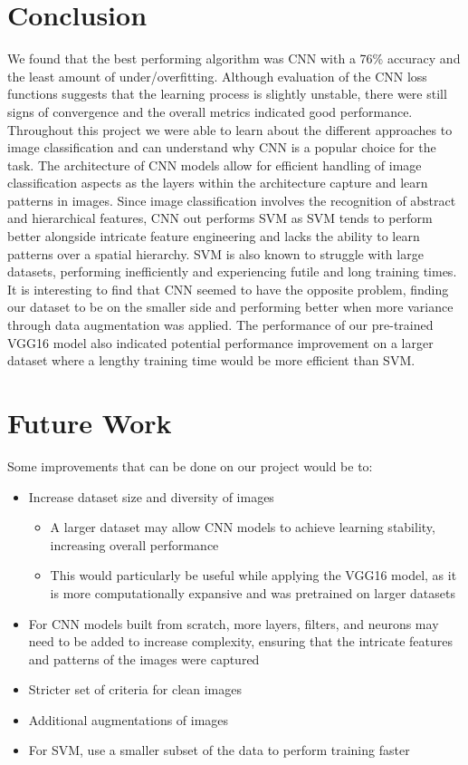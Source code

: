 %

\section{Conclusion}
We found that the best performing algorithm was CNN with a 76\% accuracy and the least amount of under/overfitting. Although evaluation of the CNN loss functions suggests that the learning process is slightly unstable, there were still signs of convergence and the overall metrics indicated good performance. Throughout this project we were able to learn about the different approaches to image classification and can understand why CNN is a popular choice for the task. The architecture of CNN models allow for efficient handling of image classification aspects as the layers within the architecture capture and learn patterns in images. Since image classification involves the recognition of abstract and hierarchical features, CNN out performs SVM as SVM tends to perform better alongside intricate feature engineering and lacks the ability to learn patterns over a spatial hierarchy. SVM is also known to struggle with large datasets, performing inefficiently and experiencing futile and long training times. It is interesting to find that CNN seemed to have the opposite problem, finding our dataset to be on the smaller side and performing better when more variance through data augmentation was applied. The performance of our pre-trained VGG16 model also indicated potential performance improvement on a larger dataset where a lengthy training time would be more efficient than SVM.

\section{Future Work}

Some improvements that can be done on our project would be to:
\begin{itemize}
    \item Increase dataset size and diversity of images
    \begin{itemize}
        \item A larger dataset may allow CNN models to achieve learning stability, increasing overall performance
        \item This would particularly be useful while applying the VGG16 model, as it is more computationally expansive and was pretrained on larger datasets
    \end{itemize}
    \item For CNN models built from scratch, more layers, filters, and neurons may need to be added to increase complexity, ensuring that the intricate features and patterns of the images were captured
    \item Stricter set of criteria for clean images
    \item Additional augmentations of images
    \item For SVM, use a smaller subset of the data to perform training faster
\end{itemize}